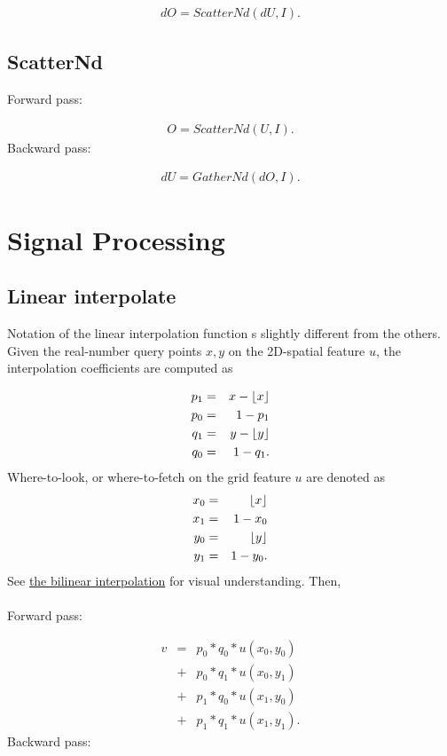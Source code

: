 \documentclass{article}
\DeclarePairedDelimiter\floor{\lfloor}{\rfloor}
\begin{document}
\begin{eqnarray}
  dO = ScatterNd(dU, I).
\end{eqnarray}


\subsection{ScatterNd}

Forward pass:

\begin{eqnarray}
  O = ScatterNd(U, I).
\end{eqnarray}
%
Backward pass:

\begin{eqnarray}
  dU = GatherNd(dO, I).
\end{eqnarray}


\section{Signal Processing}
\label{sec:Signal Processing}

\subsection{Linear interpolate}

Notation of the linear interpolation function s slightly different from the others. Given the real-number query points $x, y$ on the 2D-spatial feature $u$, the interpolation coefficients are computed as

\begin{eqnarray}
  p_1 &=& x - \floor*{x}\\
  p_0 &=& 1 - p_1 \\
  q_1 &=& y - \floor*{y}\\
  q_0 &=& 1 - q_1.
\end{eqnarray}
%
Where-to-look, or where-to-fetch on the grid feature $u$ are denoted as
\begin{eqnarray}
  x_0 &=& \floor*{x} \\
  x_1 &=& 1 - x_0 \\
  y_0 &=& \floor*{y} \\
  y_1 &=& 1 - y_0.
\end{eqnarray}
%
See \href{https://en.wikipedia.org/wiki/Bilinear_interpolation}{the bilinear interpolation} for visual understanding. Then,  \\ \\
%
Forward pass:

\begin{eqnarray}
  v &=& p_0 * q_0* u(x_0, y_0) \\
  &+& p_0 * q_1 * u(x_0, y_1) \\
  &+& p_1 * q_0 * u(x_1, y_0) \\
  &+& p_1 * q_1 * u(x_1, y_1) .
\end{eqnarray}
%
Backward pass:
\end{document}
